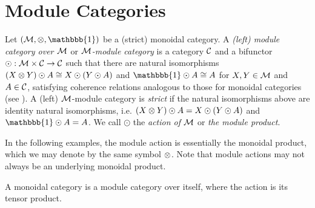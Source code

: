 \section{Module Categories}
\label{sec:module-cat}



\begin{definition}
    Let $(\mcal{M}, \tensor, \mathbbb{1})$ be a (strict) monoidal category. A \textit{(left) module category over $\mathcal{M}$} or \textit{$\mathcal{M}$-module category} is a category $\mathcal{C}$ and a bifunctor $\odot: \mathcal{M} \times \mathcal{C} \to \mathcal{C}$ such that there are natural isomorphisms $(X \otimes Y) \odot A \cong X \odot (Y \odot A)$ and $\mathbbb{1} \odot A \cong A$ for $X,Y \in \mathcal{M}$ and $A \in \mathcal{C}$, satisfying coherence relations analogous to those for monoidal categories (see \cite[Definition 7.1.2]{tensor-categories}). A (left) $\mathcal{M}$-module category is \textit{strict} if the natural isomorphisms above are identity natural isomorphisms, i.e. $(X \otimes Y) \odot A = X \odot (Y \odot A)$ and $\mathbbb{1} \odot A = A$. We call $\odot$ the \textit{action of $\mathcal{M}$} or \textit{the module product}. 
\end{definition}

In the following examples, the module action is essentially the monoidal product, which we may denote by the same symbol $\otimes$. Note that module actions may not always be an underlying monoidal product.

\begin{example}
    A monoidal category is a module category over itself, where the action is its tensor product.
\end{example}

